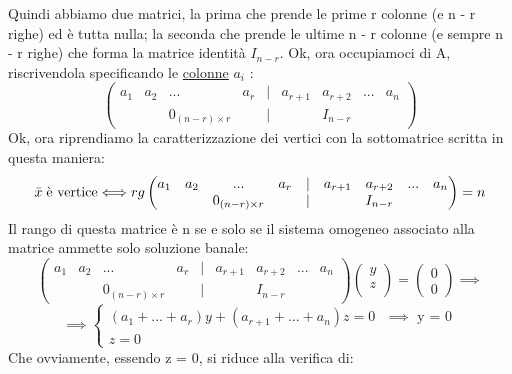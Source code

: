 Quindi abbiamo due matrici, la prima che prende le prime r colonne (e n - r righe) ed è tutta nulla; la seconda che prende le ultime n - r colonne (e sempre n - r righe) che forma la matrice identità $I_{n-r}$. Ok, ora occupiamoci di A, riscrivendola specificando le \underline{colonne} $a_i$ :
\begin{equation*}
    \begin{pmatrix}
        a_1 & a_2 & ... & a_r & | & a_{r+1} & a_{r+2} & ... & a_n\\
        & &  0_{(n-r) \times r} & & | &  & I_{n - r}
    \end{pmatrix}
\end{equation*}
Ok, ora riprendiamo la caratterizzazione dei vertici con la sottomatrice scritta in questa maniera:
\begin{equation*}
    \bar{x} \hspace{0.1cm} \text{è vertice} \Longleftrightarrow rg\begin{pmatrix}
        a_1 & a_2 & ... & a_r & | & a_{r+1} & a_{r+2} & ... & a_n\\
        & &  0_{(n-r) \times r} & & | &  & I_{n - r}
    \end{pmatrix} = n 
\end{equation*}
Il rango di questa matrice è n se e solo se il sistema omogeneo associato alla matrice ammette solo soluzione banale:
\begin{equation*}
    \begin{pmatrix}
        a_1 & a_2 & ... & a_r & | & a_{r+1} & a_{r+2} & ... & a_n\\
        & &  0_{(n-r) \times r} & & | &  & I_{n - r}
    \end{pmatrix}\begin{pmatrix}
        y\\
        z\\
    \end{pmatrix} = \begin{pmatrix}
        0\\
        0
    \end{pmatrix} \implies 
\end{equation*}
\begin{equation*}
    \implies \begin{cases}
        \text{$(a_1 + ... + a_r)y + (a_{r+1} + ... + a_{n})z = 0$ $\implies$ y = 0}\\
        \text{$z = 0$}
    \end{cases}
\end{equation*}
Che ovviamente, essendo z = 0, si riduce alla verifica di:
